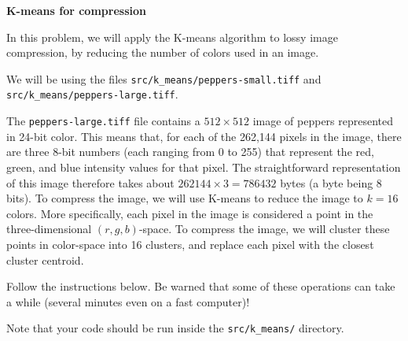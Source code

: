 \item {} {\bf K-means for compression}

In this problem, we will apply the K-means algorithm to lossy image
compression, by reducing the number of colors used in an image.

We will be using the files \texttt{src/k\_means/peppers-small.tiff} and \texttt{src/k\_means/peppers-large.tiff}.
	

The \texttt{peppers-large.tiff} file contains
a $512 \times 512$ image of peppers represented in 24-bit color. This means
that, for each of the 262,144 pixels in the image, there are three
8-bit numbers (each ranging from 0 to 255) that represent the red,
green, and blue intensity values for that pixel. The straightforward
representation of this image therefore takes about $262144 \times 3 =
786432$ bytes (a byte being 8 bits). To compress the image, we will
use K-means to reduce the image to $k = 16$ colors. More specifically,
each pixel in the image is considered a point in the three-dimensional
$(r, g, b)$-space. To compress the image, we will cluster these points
in color-space into 16 clusters, and replace each pixel with the
closest cluster centroid.

Follow the instructions below. Be warned that some of these operations
can take a while (several minutes even on a fast computer)!

Note that your code should be run inside the \texttt{src/k\_means/} directory.

\begin{enumerate}

  
\ifnum{} {
  
} \fi


  

\ifnum{} {
  
} \fi

\end{enumerate}